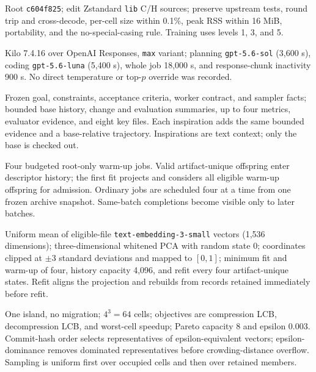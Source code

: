 \documentclass[10pt,twocolumn]{article}
\newcommand{\code}[1]{\texttt{#1}}
\begin{document}
\begin{description}[style=nextline,leftmargin=0pt,labelindent=0pt,itemsep=0.5em]
  \item[Target contract.] Root \code{c604f825}; edit Zstandard \code{lib} C/H
    sources; preserve upstream tests, round trip and cross-decode, per-cell size
    within 0.1\%, peak RSS within 16 MiB, portability, and the no-special-casing
    rule. Training uses levels 1, 3, and 5.

  \item[Agent runtime.] Kilo 7.4.16 over OpenAI Responses, \code{max} variant;
    planning \code{gpt-5.6-sol} (3,600 s), coding \code{gpt-5.6-luna} (5,400 s),
    whole job 18,000 s, and response-chunk inactivity 900 s. No direct
    temperature or top-$p$ override was recorded.

  \item[Agent context.] Frozen goal, constraints, acceptance criteria, worker
    contract, and sampler facts; bounded base history, change and evaluation
    summaries, up to four metrics, evaluator evidence, and eight key files.
    Each inspiration adds the same bounded evidence and a base-relative
    trajectory. Inspirations are text context; only the base is checked out.

  \item[Warm-up and batching.] Four budgeted root-only warm-up jobs. Valid
    artifact-unique offspring enter descriptor history; the first fit projects
    and considers all eligible warm-up offspring for admission. Ordinary jobs
    are scheduled four at a time from one frozen archive snapshot. Same-batch
    completions become visible only to later batches.

  \item[Descriptor.] Uniform mean of eligible-file
    \code{text-embedding-3-}\allowbreak\code{small} vectors (1,536 dimensions);
    three-dimensional
    whitened PCA with random state 0; coordinates clipped at $\pm3$ standard
    deviations and mapped to $[0,1]$; minimum fit and warm-up of four, history
    capacity 4,096, and refit every four artifact-unique states. Refit aligns
    the projection and rebuilds from records retained immediately before refit.

  \item[Archive.] One island, no migration; $4^3=64$ cells; objectives are
    compression LCB, decompression LCB, and worst-cell speedup; Pareto capacity
    8 and epsilon 0.003. Commit-hash order selects representatives of
    epsilon-equivalent vectors; epsilon-dominance removes dominated
    representatives before crowding-distance overflow. Sampling is uniform
    first over occupied cells and then over retained members.


\end{description}
\end{document}
